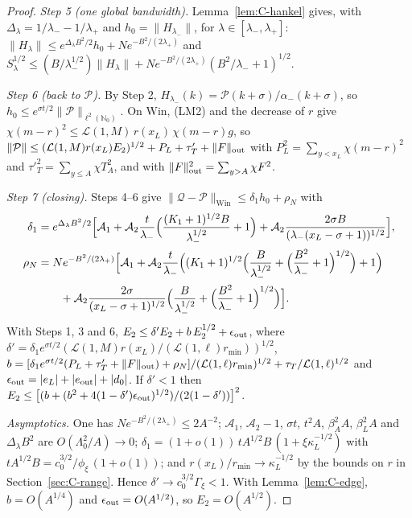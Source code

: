 \documentclass[10pt,letterpaper]{article}
\begin{document}
\begin{proof}
\emph{Step 5 (one global bandwidth).} Lemma~\ref{lem:C-hankel} gives, with $\Delta_\lambda=1/\lambda_--1/\lambda_+$ and
$h_0=\|H_{\lambda_-}\|$, for $\lambda\in[\lambda_-,\lambda_+]$:
$\|H_\lambda\|\le e^{\Delta_\lambda B^2/2}h_0+Ne^{-B^2/(2\lambda_+)}$ and
$S_\lambda^{1/2}\le(B/\lambda_-^{1/2})\|H_\lambda\|+Ne^{-B^2/(2\lambda_+)}(B^2/\lambda_-+1)^{1/2}$.

\emph{Step 6 (back to $\mathcal P$).} By Step 2, $H_{\lambda_-}(k)=\mathcal P(k+\sigma)/\alpha_-(k+\sigma)$, so $h_0\le e^{\sigma t/2}\|\mathcal P\|_{\ell^2(\mathbb N_0)}$.
On $\mathrm{Win}$, (LM2) and the decrease of $r$ give $\chi(m-r)^2\le\mathcal L(1,M)\,r(x_L)\,\chi(m-r)g$, so
$\|\mathcal P\|\le(\mathcal L(1,M)r(x_L)E_2)^{1/2}+P_L+\tau'_T+\|F\|_{\rm out}$ with $P_L^2=\sum_{y<x_L}\chi(m-r)^2$ and $\tau'^2_T=\sum_{y\le A}\chi T_A^2$, and with $\|F\|^2_{\rm out}=\sum_{y>A}\chi F^2$.

\emph{Step 7 (closing).} Steps 4--6 give $\|\mathcal Q-\mathcal P\|_{\mathrm{Win}}\le\delta_1h_0+\rho_N$ with
\begin{align*}
\delta_1&=e^{\Delta_\lambda B^2/2}\Bigl[\mathcal A_1+\mathcal A_2\frac{t}{\lambda_-}\Bigl(\frac{(K_1+1)^{1/2}B}{\lambda_-^{1/2}}+1\Bigr)
+\mathcal A_2\frac{2\sigma B}{(\lambda_-(x_L-\sigma+1))^{1/2}}\Bigr],\\
\rho_N&=Ne^{-B^2/(2\lambda_+)}\Bigl[\mathcal A_1+\mathcal A_2\frac{t}{\lambda_-}\Bigl((K_1+1)^{1/2}\Bigl(\frac{B}{\lambda_-^{1/2}}+\Bigl(\frac{B^2}{\lambda_-}+1\Bigr)^{1/2}\Bigr)+1\Bigr)\\
&\qquad+\mathcal A_2\frac{2\sigma}{(x_L-\sigma+1)^{1/2}}\Bigl(\frac{B}{\lambda_-^{1/2}}+\Bigl(\frac{B^2}{\lambda_-}+1\Bigr)^{1/2}\Bigr)\Bigr].
\end{align*}
With Steps 1, 3 and 6, $E_2\le\delta'E_2+b\,E_2^{1/2}+\epsilon_{\rm out}$, where
$\delta'=\delta_1e^{\sigma t/2}(\mathcal L(1,M)r(x_L)/(\mathcal L(1,\ell)r_{\min}))^{1/2}$,
$b=[\delta_1e^{\sigma t/2}(P_L+\tau'_T+\|F\|_{\rm out})+\rho_N]/(\mathcal L(1,\ell)r_{\min})^{1/2}+\tau_T/\mathcal L(1,\ell)^{1/2}$ and
$\epsilon_{\rm out}=|e_L|+|e_{\rm out}|+|d_0|$. If $\delta'<1$ then
$E_2\le\bigl[(b+(b^2+4(1-\delta')\epsilon_{\rm out})^{1/2})/(2(1-\delta'))\bigr]^2$.

\emph{Asymptotics.} One has $Ne^{-B^2/(2\lambda_+)}\le2A^{-2}$; $\mathcal A_1$, $\mathcal A_2-1$, $\sigma t$, $t^2A$, $\beta_A^2A$, $\beta_L^2A$ and
$\Delta_\lambda B^2$ are $O(\Lambda_0^2/A)\to0$; $\delta_1=(1+o(1))\,tA^{1/2}B\,(1+\xi\kappa_L^{-1/2})$ with
$tA^{1/2}B=c_0^{3/2}/\phi_\xi\,(1+o(1))$; and $r(x_L)/r_{\min}\to\kappa_L^{-1/2}$ by the bounds on $r$ in Section~\ref{sec:C-range}.
Hence $\delta'\to c_0^{3/2}\Gamma_\xi<1$. With Lemma~\ref{lem:C-edge}, $b=O(A^{1/4})$ and $\epsilon_{\rm out}=O(A^{1/2})$, so
$E_2=O(A^{1/2})$.
\end{proof}
\end{document}
